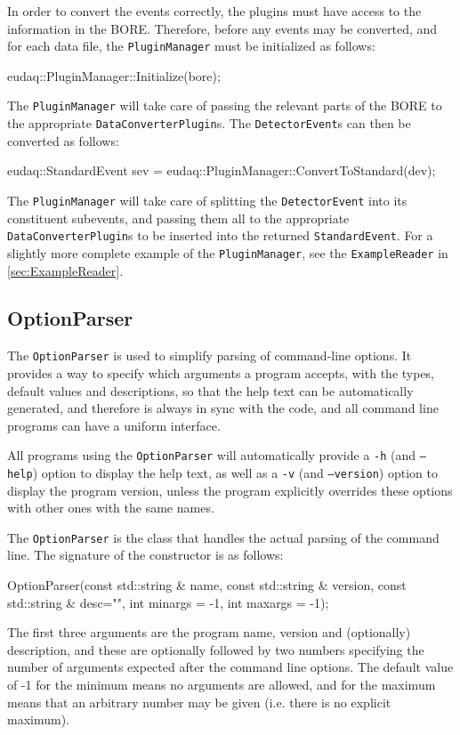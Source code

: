 In order to convert the events correctly,
the plugins must have access to the information in the BORE.
Therefore, before any events may be converted, and for each data file,
the \texttt{PluginManager} must be initialized as follows:
\begin{listing}
eudaq::PluginManager::Initialize(bore);
\end{listing}

The \texttt{PluginManager} will take care of passing the relevant parts of the \gls{BORE}
to the appropriate \texttt{DataConverterPlugin}s.
The \texttt{DetectorEvent}s can then be converted as follows:
\begin{listing}
eudaq::StandardEvent sev = eudaq::PluginManager::ConvertToStandard(dev);
\end{listing}

The \texttt{PluginManager} will take care of splitting the \texttt{DetectorEvent}
into its constituent subevents, and passing them all to the appropriate
\texttt{DataConverterPlugin}s to be inserted into the returned \texttt{StandardEvent}.
For a slightly more complete example of the \texttt{PluginManager},
see the \texttt{ExampleReader} in \autoref{sec:ExampleReader}.

\subsection{OptionParser}
The \texttt{OptionParser} is used to simplify parsing of command-line options.
It provides a way to specify which arguments a program accepts,
with the types, default values and descriptions,
so that the help text can be automatically generated,
and therefore is always in sync with the code,
and all command line programs can have a uniform interface.

All programs using the \texttt{OptionParser} will automatically provide a
\texttt{-h} (and \texttt{--help}) option to display the help text,
as well as a \texttt{-v} (and \texttt{--version}) option to display the program version,
unless the program explicitly overrides these options with other ones with the same names.

The \texttt{OptionParser} is the class that handles the actual parsing of the command line.
The signature of the constructor is as follows:
\begin{listing}
OptionParser(const std::string & name, const std::string & version,
             const std::string & desc="", int minargs = -1, int maxargs = -1);
\end{listing}
The first three arguments are the program name, version and (optionally) description,
and these are optionally followed by two numbers specifying the number of arguments
expected after the command line options.
The default value of -1 for the minimum means no arguments are allowed,
and for the maximum means that an arbitrary number may be given
(i.e. there is no explicit maximum).

